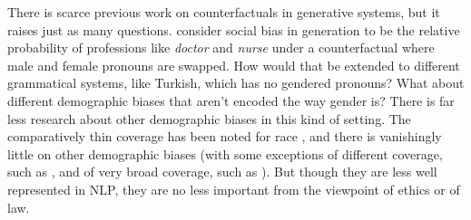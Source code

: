 There is scarce previous work on counterfactuals in generative systems, but it raises just as many questions. \citet{vig_causal} consider social bias in generation to be the relative probability of professions like \textit{doctor} and \textit{nurse} under a counterfactual where male and female pronouns are swapped. How would that be extended to different grammatical systems, like Turkish, which has no gendered pronouns? What about different demographic biases that aren't encoded the way gender is? There is far less research about other demographic biases in this kind of setting. The comparatively thin coverage has been noted for race \citep{field-etal-2021-survey}, and there is vanishingly little on other demographic biases (with some exceptions of different coverage, such as \citet{hutchinson-etal-2020-social}, and of very broad coverage, such as \citet{esiobu-etal-2023-robbie}). But though they are less well represented in NLP, they are no less important from the viewpoint of ethics or of law. 


